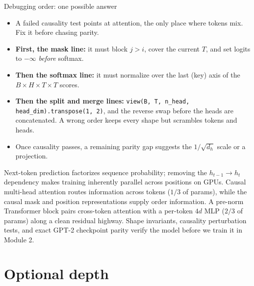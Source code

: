 \documentclass[handout]{beamer}
\begin{document}
\begin{frame}{Debugging order: one possible answer}
  \small
  \begin{itemize}
      \setlength{\itemsep}{8pt}
    \item A failed causality test points at attention, the only place where tokens mix. Fix it before chasing parity.
    \item \textbf{First, the mask line:} it must block $j>i$, cover the current $T$, and set logits to $-\infty$ \emph{before} softmax.
    \item \textbf{Then the softmax line:} it must normalize over the last (key) axis of the $B\times H\times T\times T$ scores.
    \item \textbf{Then the split and merge lines:} \texttt{view(B, T, n\_head, head\_dim).transpose(1, 2)}, and the reverse swap before the heads are concatenated. A wrong order keeps every shape but scrambles tokens and heads.
    \item Once causality passes, a remaining parity gap suggests the $1/\sqrt{d_h}$ scale or a projection.
  \end{itemize}
\end{frame}

\takeaways
{Next-token prediction factorizes sequence probability; removing the $h_{t-1}\to h_t$ dependency makes training inherently parallel across positions on GPUs.}
{Causal multi-head attention routes information across tokens ($1/3$ of params), while the causal mask and position representations supply order information.}
{A pre-norm Transformer block pairs cross-token attention with a per-token $4d$ MLP ($2/3$ of params) along a clean residual highway.}
{Shape invariants, causality perturbation tests, and exact GPT-2 checkpoint parity verify the model before we train it in Module 2.}

\appendix
\section{Optional depth}
\end{document}
